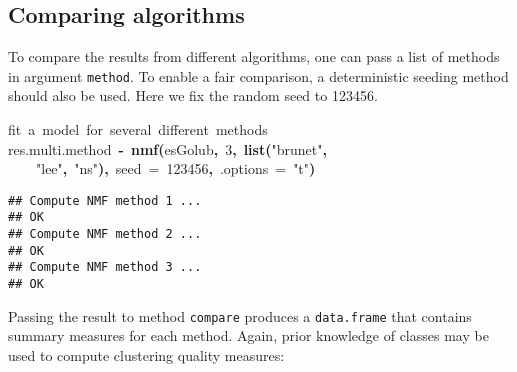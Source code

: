 \documentclass[a4paper]{article}\usepackage{graphicx, color}
\makeatletter
\newcommand{\hlnumber}[1]{\textcolor[rgb]{0,0,0}{#1}}%
\newcommand{\hlfunctioncall}[1]{\textcolor[rgb]{0.501960784313725,0,0.329411764705882}{\textbf{#1}}}%
\newcommand{\hlstring}[1]{\textcolor[rgb]{0.6,0.6,1}{#1}}%
\newcommand{\hlkeyword}[1]{\textcolor[rgb]{0,0,0}{\textbf{#1}}}%
\newcommand{\hlargument}[1]{\textcolor[rgb]{0.690196078431373,0.250980392156863,0.0196078431372549}{#1}}%
\newcommand{\hlcomment}[1]{\textcolor[rgb]{0.180392156862745,0.6,0.341176470588235}{#1}}%
\newcommand{\hlassignement}[1]{\textcolor[rgb]{0,0,0}{\textbf{#1}}}%
\newcommand{\hlsymbol}[1]{\textcolor[rgb]{0,0,0}{#1}}%
\newcommand{\hlstd}[1]{\textcolor[rgb]{0,0,0}{#1}}%
\newenvironment{kframe}{%
 \def\FrameCommand##1{\hskip\@totalleftmargin \hskip-\fboxsep
 \colorbox{shadecolor}{##1}\hskip-\fboxsep
     \hskip-\linewidth \hskip-\@totalleftmargin \hskip\columnwidth}%
 \MakeFramed {\advance\hsize-\width
   \@totalleftmargin\z@ \linewidth\hsize
   \@setminipage}}%
 {\par\unskip\endMakeFramed}
\newenvironment{knitrout}{}{} %
\let\code=\texttt
\makeatother
\begin{document}
\subsection{Comparing algorithms}
To compare the results from different algorithms, one can pass a list of methods in argument \code{method}. 
To enable a fair comparison, a deterministic seeding method should also be used. 
Here we fix the random seed to 123456. 

\begin{knitrout}
\color{fgcolor}\begin{kframe}
\begin{flushleft}
\ttfamily\noindent
\hlcomment{\usebox{\hlnormalsizeboxhash}{\ }fit{\ }a{\ }model{\ }for{\ }several{\ }different{\ }methods}\hspace*{\fill}\\
\hlstd{}\hlsymbol{res.multi.method}{\ }\hlassignement{\usebox{\hlnormalsizeboxlessthan}-}{\ }\hlfunctioncall{nmf}\hlkeyword{(}\hlsymbol{esGolub}\hlkeyword{,}{\ }\hlnumber{3}\hlkeyword{,}{\ }\hlfunctioncall{list}\hlkeyword{(}\hlstring{"{}brunet"{}}\hlkeyword{,}\hspace*{\fill}\\
\hlstd{}{\ }{\ }{\ }{\ }\hlstring{"{}lee"{}}\hlkeyword{,}{\ }\hlstring{"{}ns"{}}\hlkeyword{)}\hlkeyword{,}{\ }\hlargument{seed}{\ }\hlargument{=}{\ }\hlnumber{123456}\hlkeyword{,}{\ }\hlargument{.options}{\ }\hlargument{=}{\ }\hlstring{"{}t"{}}\hlkeyword{)}\mbox{}
\normalfont
\end{flushleft}
\begin{verbatim}
## Compute NMF method 1 ...
## OK
## Compute NMF method 2 ...
## OK
## Compute NMF method 3 ...
## OK
\end{verbatim}
\end{kframe}
\end{knitrout}


Passing the result to method \code{compare} produces a \code{data.frame} that contains summary measures for each method. Again, prior knowledge of classes may be used to compute clustering quality measures:  
\end{document}

